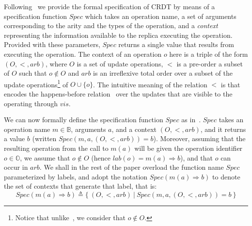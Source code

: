Following~\cite{Burckhardt:2014} we provide the formal specification of
CRDT by means of a specification function $\mathit{Spec}$ which takes
an operation name, a set of arguments corresponding to the arity and
the types of the operation, and a \emph{context} representing the
information available to the replica executing the operation.
Provided with these parameters, $\mathit{Spec}$ returns a single value
that results from executing the operation.
%
The context of an operation $o$ here is a triple of the form
$(O,<,\mathit{arb})$, where $O$ is a set of update operations, $<$ is
a pre-order a subset of $O$ such that $o \notin O$ and $\mathit{arb}$
is an irreflexive total order over a subset of the update
operations\footnote{Notice that unlike~\cite{Burckhardt:2014}, we
  consider that $o \notin O$. } of $O \cup \{o\}$.
%
%
The intuitive meaning of the relation $<$ is that encodes the
happens-before relation~\cite{Lamport:1978} over the updates that are
visible to the operating through $\mathit{vis}$.

We can now formally define the specification function $\mathit{Spec}$
as in~\cite{Burckhardt:2014}.
$\mathit{Spec}$ takes an operation name $m \in \mathbb{B}$, arguments
$a$, and a context $(O, <, \mathit{arb})$, and it returns a value $b$
(written $\mathit{Spec}(m, a, (O, <, \mathit{arb})) = b$).
%
Moreover, assuming that the resulting operation from the call to
$m(a)$ will be given the operation identifier $o \in \mathbb{O}$, we
assume that $o\notin O$ (hence $lab(o) = m(a) \Rightarrow b$), and
that $o$ can occur in $\mathit{arb}$.
%
We shall in the rest of the paper overload the function name
$\mathit{Spec}$ parameterized by labels, and adopt the notation
\mbox{$Spec(m(a) \Rightarrow b)$} to denote the set of contexts that
generate that label, that is:
\[Spec(m(a) \Rightarrow b) \triangleq \{\ (O, <, \mathit{arb})\ |\
  Spec(m, a, (O, <, \mathit{arb})) = b\ \}\]
%



